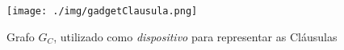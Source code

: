 \begin{figure}[htb]	
\center%
\texttt{[image: ./img/gadgetClausula.png]}
\caption{Grafo $G_{C}$, utilizado como \textit{dispositivo} para representar as Cláusulas}
\label{fig:gadgetBaseClausula}
\end{figure}
